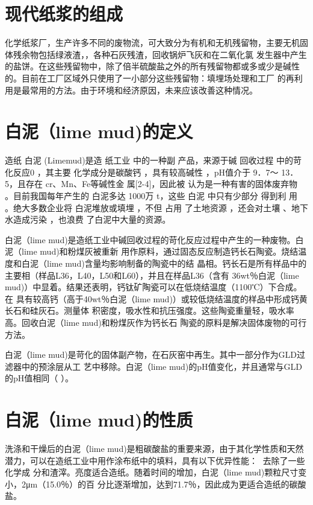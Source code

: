\documentclass[11pt]{article}
\begin{document}
\section{现代纸浆的组成}
\label{sec:org350a906}
化学纸浆厂，生产许多不同的废物流，可大致分为有机和无机残留物，主要无机固体残余物包括绿液渣，，各种石灰残渣，回收锅炉飞灰和在二氧化氯
发生器中产生的盐饼。在这些残留物中，除了倍半硫酸盐之外的所有残留物都或多或少是碱性
的。目前在工厂区域外只使用了一小部分这些残留物：填埋场处理和工厂
的再利用是最常用的方法。由于环境和经济原因，未来应该改善这种情况。\cite{Kinnarinen_2016}

\section{白泥（lime mud)的定义}
\label{sec:orge38e1ae}
造纸 白泥 (Limemud)是造 纸工业 中的一种副
产品，来源于碱 回收过程 中的苛化反应0 ，其主要
化学成分是碳酸钙 ，具有较高碱性 ，pH值介于 9．7～
13．5，且存在 cr、Mn、Fe等碱性金 属[2-4]，因此被
认为是一种有害的固体废弃物 。目前我国每年产生的
白泥多达 1000万 t，这些 白泥 中只有少部分 得到利
用 。绝大多数企业将 白泥堆放或填埋 ，不但 占用
了土地资源 ，还会对土壤 、地下水造成污染 ，也浪费
了白泥中大量的资源。\cite{Application_ofLim_eM_ud_forPreparation_ofCeram_sites}

白泥（lime mud)是造纸工业中碱回收过程的苛化反应过程中产生的一种废物。白泥（lime mud)和粉煤灰被重新
用作原料，通过固态反应制造钙长石陶瓷。烧结温度和白泥（lime mud)含量均影响制备的陶瓷中的结
晶相。钙长石是所有样品中的主要相（样品L36，L40，L50和L60），并且在样品L36（含有
36wt％白泥（lime mud)）中显着。结果还表明，钙钛矿陶瓷可以在低烧结温度（1100℃）下合成。在
具有较高钙（高于40wt％白泥（lime mud)）或较低烧结温度的样品中形成钙黄长石和硅灰石。测量体
积密度，吸水性和抗压强度。这些陶瓷重量轻，吸水率高。回收白泥（lime mud)和粉煤灰作为钙长石
陶瓷的原料是解决固体废物的可行方法。 \cite{qin15_recyc_lime_mud_fly_ash}

白泥（lime mud)是苛化的固体副产物，在石灰窑中再生。其中一部分作为GLD过滤器中的预涂层从工
艺中移除。白泥（lime mud)的pH值变化，并且通常与GLD的pH值相同（
\cite{sthiannopkao09_utiliz_pulp_paper_indus_wastes}）。


\section{白泥（lime mud)的性质}
\label{sec:org39adcac}
洗涤和干燥后的白泥（lime mud)是粗碳酸盐的重要来源，由于其化学性质和天然潜力，可以在造纸工业中用作涂布纸中的填料，具有以下优异性能： 去除了一些化学成
分和渣滓。亮度适合造纸。随着时间的增加，白泥（lime mud)颗粒尺寸变小，2μm（15.0％）的百
分比逐渐增加，达到71.7％，因此成为更适合造纸的碳酸盐。\cite{article}
\end{document}
